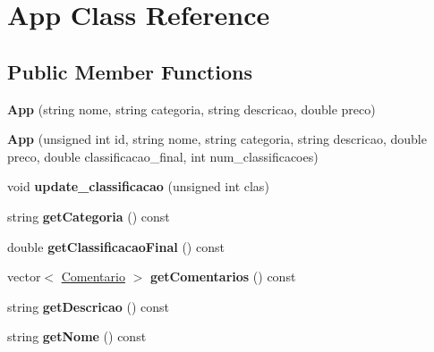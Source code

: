 \hypertarget{class_app}{\section{App Class Reference}
\label{class_app}
}
\subsection*{Public Member Functions}
\begin{DoxyCompactItemize}
\item 
\hypertarget{class_app_ae491b91a0a622aa5f78559403b83e0df}{{\bfseries App} (string nome, string categoria, string descricao, double preco)}\label{class_app_ae491b91a0a622aa5f78559403b83e0df}

\item 
\hypertarget{class_app_a77f4deed2edae59b74f5aca757c1368a}{{\bfseries App} (unsigned int id, string nome, string categoria, string descricao, double preco, double classificacao\+\_\+final, int num\+\_\+classificacoes)}\label{class_app_a77f4deed2edae59b74f5aca757c1368a}

\item 
\hypertarget{class_app_ac720715c2e11bfc218842141b9c6e0d2}{void {\bfseries update\+\_\+classificacao} (unsigned int clas)}\label{class_app_ac720715c2e11bfc218842141b9c6e0d2}

\item 
\hypertarget{class_app_a58076d5e40336d8f1489f49ebcc648ac}{string {\bfseries get\+Categoria} () const }\label{class_app_a58076d5e40336d8f1489f49ebcc648ac}

\item 
\hypertarget{class_app_a99b0df2b556e0d0967af13f37b47178e}{double {\bfseries get\+Classificacao\+Final} () const }\label{class_app_a99b0df2b556e0d0967af13f37b47178e}

\item 
\hypertarget{class_app_a55940da54fefa49300678f6ce87eeb04}{vector$<$ \hyperlink{class_comentario}{Comentario} $>$ {\bfseries get\+Comentarios} () const }\label{class_app_a55940da54fefa49300678f6ce87eeb04}

\item 
\hypertarget{class_app_a2dcf86011e3b1e8dc8d027f4b4b4b253}{string {\bfseries get\+Descricao} () const }\label{class_app_a2dcf86011e3b1e8dc8d027f4b4b4b253}

\item 
\hypertarget{class_app_a7b94ca7878eb536a1d1b1448c2072bea}{string {\bfseries get\+Nome} () const }\label{class_app_a7b94ca7878eb536a1d1b1448c2072bea}


\end{DoxyCompactItemize}
